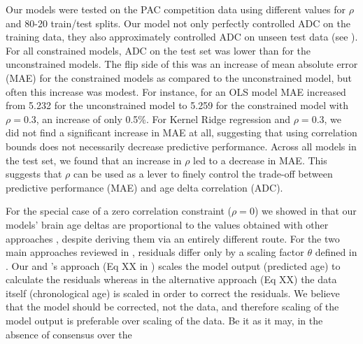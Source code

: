 \documentclass[utf8]{frontiersSCNS} %
\renewcommand{\a}{\theta}
\begin{document}
Our models were tested on the PAC competition data  using different values for $\rho$ and 
80-20 train/test splits. Our model not only perfectly controlled ADC on the training data, they also approximately controlled ADC on unseen test data (see ). For all constrained models, ADC on the test set was lower than for the unconstrained models. The flip side of this was an increase of mean absolute error (MAE) for the constrained models as compared to the unconstrained model, but often this increase was modest. For instance, for an OLS model MAE increased from 5.232 for the unconstrained model to 5.259 for the constrained model with $\rho=0.3$, an increase of only 0.5\%. For Kernel Ridge regression and $\rho=0.3$, we did not find a significant increase in MAE at all, suggesting that using correlation bounds does not necessarily decrease predictive performance. Across all models in the test set, we found that an increase in $\rho$ led to a decrease in MAE. This suggests that $\rho$ can be used as a lever to finely control the trade-off between predictive performance (MAE) and age delta correlation (ADC). 

For the special case of a zero correlation constraint ($\rho = 0$) we showed in  that our models' brain age deltas are proportional to the values obtained with other approaches  \citep{Cole2018BrainMortality,deLange2020Commentary:Prediction,Le2018ABrainAGE,Smith2019EstimationImaging,Beheshti2019Bias-adjustmentScheme}, despite deriving them via an entirely different route. For the two main approaches reviewed in , residuals differ only by a scaling factor $\a$ defined in . Our and \cite{Cole2018BrainMortality}'s approach (Eq XX in ) scales the model output (predicted age) to calculate the residuals whereas in the alternative approach (Eq XX) the data itself (chronological age) is scaled in order to correct the residuals. 
We believe that the model should be corrected, not the data, and therefore scaling of the model output is preferable over scaling of the data. Be it as it may, in the absence of consensus over the 
\end{document}
